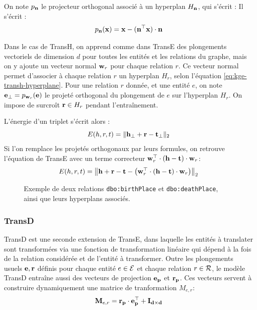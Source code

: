 On note $p_{\bf{n}}$ le projecteur orthogonal associé à un hyperplan $H_{\bf{n}}$, qui s'écrit : %
Il s'écrit :
\begin{equation}
    p_{\bf{n}}(\bf{x}) = \bf{x - (n^\top x) \cdot n}
\end{equation}

Dans le cas de TransH, on apprend comme dans TransE des plongements vectoriels de dimension $d$ pour toutes les entités et les relations du graphe, mais on y ajoute un vecteur normal $\bf{w}_r$ pour chaque relation $r$. Ce vecteur normal permet d'associer à chaque relation $r$ un hyperplan $H_r$, selon l'équation \ref{eq:kge-transh-hyperplane}.
%
Pour une relation $r$ donnée, et une entité $e$, on note $\bf{e_\bot} = p_{\bf{w}_r}(\bf{e})$ le projeté orthogonal du plongement de $e$ sur l'hyperplan $H_r$. On impose de surcroît $\bf{r} \in H_r$ pendant l'entraînement.

L'énergie d'un triplet s'écrit alors :
\begin{equation}
    E(h, r, t) = \| \bf{h_\bot + r - t_\bot} \|_2
    \label{eq:kge-transh-main}
\end{equation}
Si l'on remplace les projetés orthogonaux par leurs formules, on retrouve l'équation de TransE avec un terme correcteur $\bf{w}_r^\top \cdot (\bf{h - t}) \cdot \bf{w}_r$:
\begin{equation}
    E(h, r, t) = \left\| \bf{h + r - t} - \left( \bf{w}_r^\top \cdot (\bf{h - t}) \cdot \bf{w}_r \right) \right\|_2
    \label{eq:kge-transh-long}
\end{equation}

\begin{figure}[hbt]
    \centering
    
    \caption[Exemple des possibilités laissées par TransH]{Exemple de deux relations \texttt{dbo:birthPlace} et \texttt{dbo:deathPlace}, ainsi que leurs hyperplans associés.}
    \label{fig:transh-dual}
\end{figure}

\subsubsection{TransD}

TransD est une seconde extension de TransE, dans laquelle les entités à translater sont transformées via une fonction de transformation linéaire qui dépend à la fois de la relation considérée et de l'entité à transformer. Outre les plongements usuels $\bf{e}, \bf{r}$ définis pour chaque entité $e \in \Ent $ et chaque relation $r \in \Rel$, le modèle TransD entraîne aussi des vecteurs de projection $\bf{e_p}$ et $\bf{r_p}$. Ces vecteurs servent à construire dynamiquement une matrice de tranformation $M_{e, r}$:
\begin{equation}
    \label{eq:kge-transd-matrix}
    \bf{M}_{e, r} = \bf{r_p \cdot e_p^\top + I_{d \times d}}
\end{equation}


